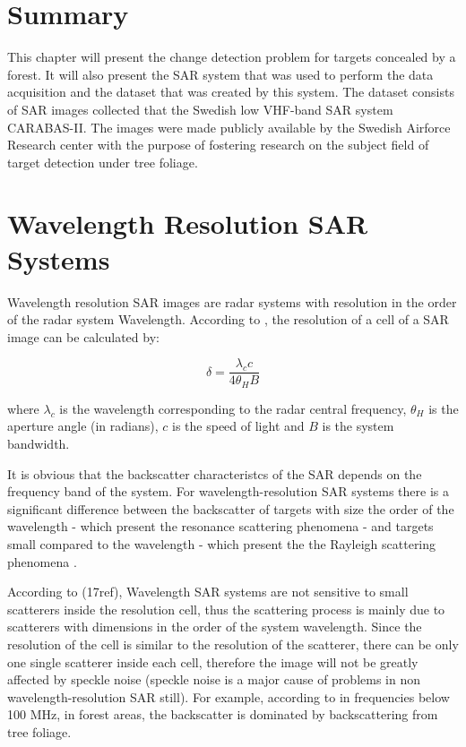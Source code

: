 \section{Summary}
This chapter will present the change detection problem for targets concealed by a forest. It will 
also present the SAR system that was used to perform the data acquisition and the dataset that was created by this system.
The dataset consists of SAR images collected that the Swedish low VHF-band SAR system CARABAS-II. 
The images were made publicly available by the Swedish Airforce Research center with the purpose of fostering research on the 
subject field of target detection under tree foliage. 


\section{Wavelength Resolution SAR Systems}
Wavelength resolution SAR images are radar systems with resolution in the order of 
the radar system Wavelength. According to \cite{62}, the resolution of a cell of a SAR image can be
calculated by:

\begin{equation}
    \delta = \frac{\lambda_c c}{4 \theta_H B}
\end{equation}

where $\lambda_c$ is the wavelength corresponding to the radar central frequency, $\theta_H$
is the aperture angle (in radians), $c$ is the speed of light and $B$ is the system bandwidth.

It is obvious that the backscatter characteristcs of the SAR depends on the frequency band of the system.
For wavelength-resolution SAR systems there is a significant difference between the backscatter of targets with size the order
of the wavelength - which present the resonance scattering phenomena \cite{63} - and targets small compared to the wavelength - which present
the the Rayleigh scattering phenomena \cite{63}. 

According to (17ref), Wavelength SAR systems are not sensitive to small scatterers inside the resolution cell,
thus the scattering process is mainly due to scatterers with dimensions in the order of the system wavelength.
Since the resolution of the cell is similar to the resolution of the scatterer, there can be only one single scatterer inside each cell, 
therefore the image will not be greatly affected by speckle noise (speckle noise is a major cause of problems in non wavelength-resolution SAR still). For example, according to \cite{64}
in frequencies below 100 MHz, in forest areas, the backscatter is dominated by backscattering from tree foliage.

